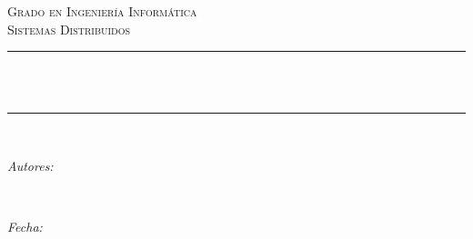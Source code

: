 \begin{titlepage}
	\centering
	\vspace*{0.5 cm}
	\textsc{\Large Grado en Ingeniería Informática}\\[0.5 cm]
	\textsc{\LARGE Sistemas Distribuidos}\\[0.5 cm]
	\rule{\linewidth}{0.2 mm} \\[0.4 cm]
	{ \huge \bfseries \thetitle}\\
	\rule{\linewidth}{0.2 mm} \\[1.5 cm]
	\begin{minipage}{0.4\textwidth}
		\begin{flushleft} \large
			\emph{Autores:}\\
			\theauthor
		\end{flushleft}
	\end{minipage}~
	\begin{minipage}{0.453\textwidth}
		\begin{flushright} \large
			\emph{Fecha:}\\
			\thedate
		\end{flushright}
	\end{minipage}\\[2 cm]
	\vfill
\end{titlepage}
\pagebreak